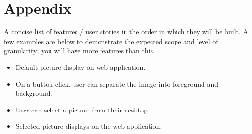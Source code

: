 \documentclass[12pt]{article}
\begin{document}
\newpage
\section*{Appendix}
A concise list of features / user stories in the order in which they will be built. A few examples are below to demonstrate the expected scope and level of granularity; you will have more features than this.
\begin{itemize}
	\item Default picture display on web application.
	\item On a button-click, user can separate the image into foreground and background.
	\item User can select a picture from their desktop.
	\item Selected picture displays on the web application.
\end{itemize}




\end{document}
